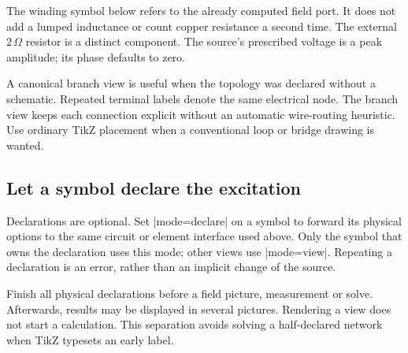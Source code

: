 The winding symbol below refers to the already computed field port. It does not
add a lumped inductance or count copper resistance a second time. The external
$2\,\Omega$ resistor is a distinct component. The source's prescribed voltage
is a peak amplitude; its phase defaults to zero.
\begin{codeexample}[width=0pt]
\end{codeexample}

A canonical branch view is useful when the topology was declared without a
schematic. Repeated terminal labels denote the same electrical node. The branch
view keeps each connection explicit without an automatic wire-routing heuristic.
Use ordinary TikZ placement when a conventional loop or bridge drawing is wanted.
\begin{codeexample}[]
\end{codeexample}

\subsection{Let a symbol declare the excitation}
Declarations are optional. Set |mode=declare| on a symbol to forward its physical
options to the same circuit or element interface used above. Only the symbol
that owns the declaration uses this mode; other views use |mode=view|. Repeating
a declaration is an error, rather than an implicit change of the source.

Finish all physical declarations before a field picture, measurement or solve.
Afterwards, results may be displayed in several pictures. Rendering a view does
not start a calculation. This separation avoids solving a half-declared network
when TikZ typesets an early label.
\begin{codeexample}[width=0pt]
\end{codeexample}

